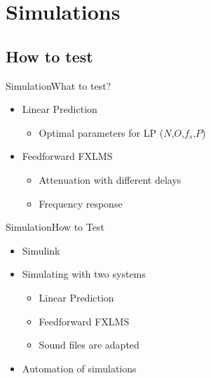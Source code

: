 


\section{Simulations}
\subsection{How to test}

\begin{frame}{Simulation}{What to test?}	
\begin{itemize}
	\item Linear Prediction
	\begin{itemize}
		\item Optimal parameters for LP ($N$,$O$,$f_s$,$P$)
	\end{itemize}
	\item Feedforward FXLMS	
	\begin{itemize}
		\item Attenuation with different delays
		\item Frequency response
	\end{itemize}
\end{itemize}
\end{frame}

\begin{frame}{Simulation}{How to Test}	
\begin{itemize}
	\item Simulink
	\item Simulating with two systems 
	\begin{itemize}
		\item Linear Prediction
		\item Feedforward FXLMS
		\item Sound files are adapted 
	\end{itemize}
	\item Automation of simulations	
\end{itemize}
\end{frame}

